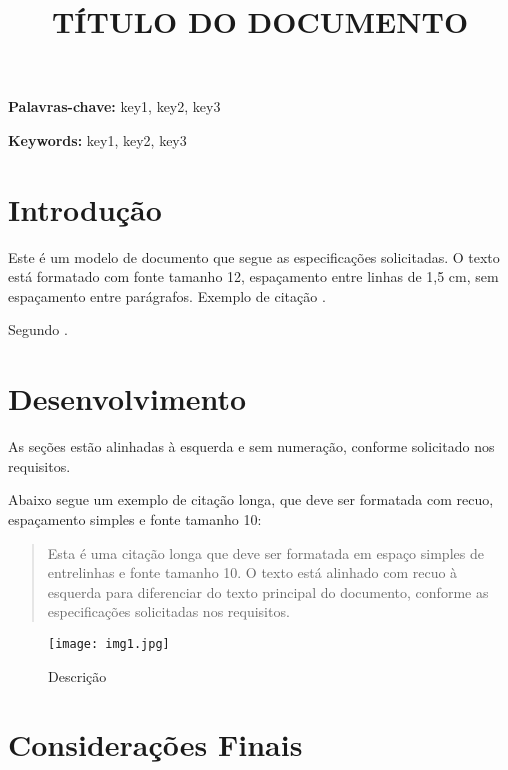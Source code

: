 \documentclass{wticifes}
\begin{document}
\onehalfspacing

\title{TÍTULO DO DOCUMENTO}
\maketitle


\begin{resumo}
\lipsum[1]
\end{resumo}

\noindent\textbf{Palavras-chave:} key1, key2, key3

\vspace{0.5cm}
\begin{abstract}
\lipsum[1]
\end{abstract}

\noindent\textbf{Keywords:} key1, key2, key3

\section{Introdução}
Este é um modelo de documento que segue as especificações solicitadas. O texto está formatado com fonte tamanho 12, espaçamento entre linhas de 1,5 cm, sem espaçamento entre parágrafos. Exemplo de citação \cite{teste2023}.

Segundo .

\lipsum[1]

\section{Desenvolvimento}
As seções estão alinhadas à esquerda e sem numeração, conforme solicitado
nos requisitos.

\lipsum[1]

Abaixo segue um exemplo de citação longa, que deve ser formatada com recuo, espaçamento simples e fonte tamanho 10:

\begin{quote}
Esta é uma citação longa que deve ser formatada em espaço simples de entrelinhas e fonte tamanho 10. O texto está alinhado com recuo à esquerda para diferenciar do texto principal do documento, conforme as especificações solicitadas nos requisitos.
\end{quote}

\lipsum[3]

\begin{figure}
    \centering
    \texttt{[image: img1.jpg]}
    \caption{Descrição}
    \label{fig:enter-label}
\end{figure}

\section{Considerações Finais}
\lipsum[2]

\end{document}
